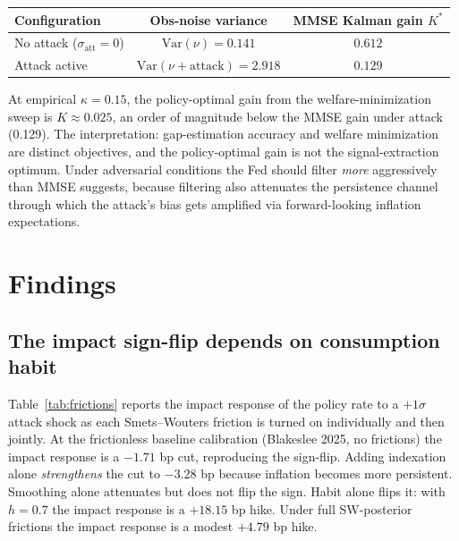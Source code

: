 \documentclass[12pt]{article}
\begin{document}
\begin{center}\small
\begin{tabular}{lcc}
\toprule
Configuration & Obs-noise variance & MMSE Kalman gain \(K^*\) \\
\midrule
No attack (\(\sigma_{\text{att}} = 0\))  & \(\mathrm{Var}(\nu) = 0.141\)                            & \(0.612\) \\
Attack active                            & \(\mathrm{Var}(\nu + \text{attack}) = 2.918\)            & \(0.129\) \\
\bottomrule
\end{tabular}
\end{center}
At empirical \(\kappa = 0.15\), the policy-optimal gain from the welfare-minimization sweep is \(K \approx 0.025\), an order of magnitude below the MMSE gain under attack (0.129). The interpretation: gap-estimation accuracy and welfare minimization are distinct objectives, and the policy-optimal gain is not the signal-extraction optimum. Under adversarial conditions the Fed should filter \emph{more} aggressively than MMSE suggests, because filtering also attenuates the persistence channel through which the attack's bias gets amplified via forward-looking inflation expectations.

\section{Findings}\label{sec:findings}

\subsection{The impact sign-flip depends on consumption habit}

Table~\ref{tab:frictions} reports the impact response of the policy rate to a \(+1\sigma\) attack shock as each Smets--Wouters friction is turned on individually and then jointly. At the frictionless baseline calibration (Blakeslee 2025, no frictions) the impact response is a \(-1.71\) bp cut, reproducing the sign-flip. Adding indexation alone \emph{strengthens} the cut to \(-3.28\) bp because inflation becomes more persistent. Smoothing alone attenuates but does not flip the sign. Habit alone flips it: with \(h = 0.7\) the impact response is a \(+18.15\) bp hike. Under full SW-posterior frictions the impact response is a modest \(+4.79\) bp hike.
\end{document}
